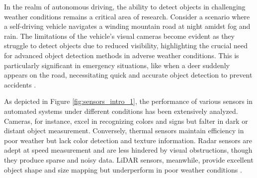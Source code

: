 \documentclass[report.tex]{subfiles}
\begin{document}


        In the realm of autonomous driving, the ability to detect objects in challenging weather conditions remains a critical area of research. Consider a scenario where a self-driving vehicle navigates a winding mountain road at night amidst fog and rain. The limitations of the vehicle's visual cameras become evident as they struggle to detect objects due to reduced visibility, highlighting the crucial need for advanced object detection methods in adverse weather conditions. This is particularly significant in emergency situations, like when a deer suddenly appears on the road, necessitating quick and accurate object detection to prevent accidents \cite{yurtsever2020survey} \cite{carballo2020libre} \cite{mcity2020}.

        As depicted in Figure \ref{fig:sensors_intro_1}, the performance of various sensors in automated systems under different conditions has been extensively analyzed. Cameras, for instance, excel in recognizing colors and signs but falter in dark or distant object measurement. Conversely, thermal sensors maintain efficiency in poor weather but lack color detection and texture information. Radar sensors are adept at speed measurement and are less hindered by visual obstructions, though they produce sparse and noisy data. LiDAR sensors, meanwhile, provide excellent object shape and size mapping but underperform in poor weather conditions \cite{Sensor_modality_characteristics_1}.
\end{document}
